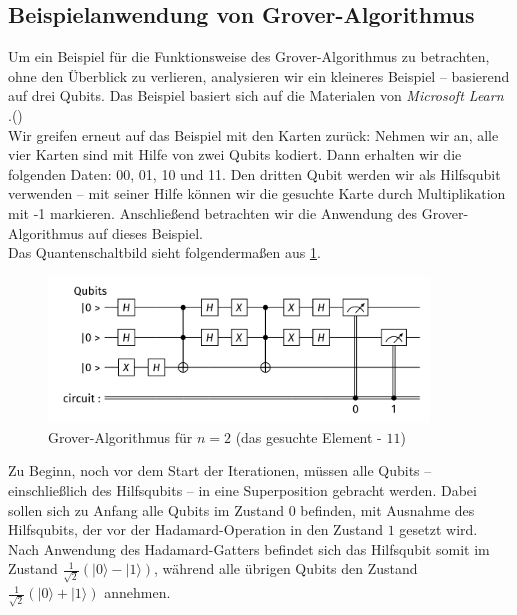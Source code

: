 \subsection{Beispielanwendung von Grover-Algorithmus}

Um ein Beispiel für die Funktionsweise des Grover-Algorithmus zu betrachten, ohne den Überblick zu verlieren, analysieren wir ein kleineres Beispiel – basierend auf drei Qubits. Das Beispiel basiert sich auf die Materialen von \textit{Microsoft Learn
}.(\cite{noauthor_theory_2025})\\ 

Wir greifen erneut auf das Beispiel mit den Karten zurück: Nehmen wir an, alle vier Karten sind mit Hilfe von zwei Qubits kodiert. Dann erhalten wir die folgenden Daten: 00, 01, 10 und 11. Den dritten Qubit werden wir als Hilfsqubit  verwenden – mit seiner Hilfe können wir die gesuchte Karte durch Multiplikation mit -1 markieren. Anschließend betrachten wir die Anwendung des Grover-Algorithmus auf dieses Beispiel.\\

Das Quantenschaltbild sieht folgendermaßen aus \ref{fig:grover-three-bits}.
\begin{figure}[h!]
    \centering
    \includegraphics[width=0.9\textwidth]{images/basic-algorithms/3-qubits-grover.png}
    \caption{Grover-Algorithmus für $n=2$ (das gesuchte Element - $11$)}
    \label{fig:grover-three-bits}
\end{figure}

Zu Beginn, noch vor dem Start der Iterationen, müssen alle Qubits – einschließlich des Hilfsqubits – in eine Superposition gebracht werden. Dabei sollen sich zu Anfang alle Qubits im Zustand $0$ befinden, mit Ausnahme des Hilfsqubits, der vor der Hadamard-Operation in den Zustand $1$ gesetzt wird.\\

Nach Anwendung des Hadamard-Gatters befindet sich das Hilfsqubit somit im Zustand $\frac{1}{\sqrt{2}}(|0\rangle - |1\rangle)$, während alle übrigen Qubits den Zustand $\frac{1}{\sqrt{2}}(|0\rangle + |1\rangle)$ annehmen.

